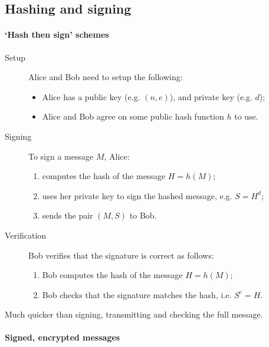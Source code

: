 \documentclass[a4paper, 11pt, openany]{book}
\numberwithin{equation}{section}
\theoremstyle{plain}
\theoremstyle{definition}
\begin{document}
\subsection{Hashing and signing}

\paragraph{‘Hash then sign’ schemes}

\begin{description}
\item [Setup] Alice and Bob need to setup the following:
\begin{itemize}
    \item Alice has a public key (e.g. $(n,e)$), and private key (e.g. $d$);
    
    \item Alice and Bob agree on some public hash function $h$ to use.
\end{itemize}

\item [Signing] To sign a message $M$, Alice:
\begin{enumerate}
    \item computes the hash of the message $H = h(M)$;
    
    \item uses her private key to sign the hashed message, e.g. $S = H^d$;

    \item sends the pair $(M,S)$ to Bob.
\end{enumerate}

\item [Verification] Bob verifies that the signature is correct as follows:
\begin{enumerate}
    \item Bob computes the hash of the message $H = h(M)$;

    \item Bob checks that the signature matches the hash, i.e. $S^e = H$.
\end{enumerate}
\end{description}

Much quicker than signing, transmitting and checking the full message.



\paragraph{Signed, encrypted messages}
\end{document}
